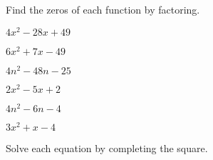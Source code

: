 \documentclass{report}
\theoremstyle{definition}
\begin{document}
 \newpage


\noindent Find the zeros of each function by factoring.\\
 
 \begin{enumerate}
\setcounter{enumi}{2}


	\begin{minipage}[t]{0.45\linewidth}
		\item  $4x^2-28x+49$ \\
		\vspace{2.5cm}
	\end{minipage}
	\hfill
	\begin{minipage}[t]{0.45\linewidth}
		\item  $6x^2+7x-49$\\
		\vspace{2.5cm}
	\end{minipage}
	\begin{minipage}[t]{0.45\linewidth}
		\item $4n^2-48n-25$\\
		\vspace{2.5cm}
	\end{minipage}
	\hfill
	\begin{minipage}[t]{0.45\linewidth}
		\item $2x^2-5x+2$\\
		\vspace{2.5cm}
	\end{minipage}
	\begin{minipage}[t]{0.45\linewidth}
		\item $4n^2-6n-4$\\
		\vspace{2.5cm}
	\end{minipage}
	\hfill
	\begin{minipage}[t]{0.45\linewidth}
		\item $3x^2+x-4$ \\
		\vspace{2.5cm}
	\end{minipage}

\end{enumerate}

\vspace{-1.5cm}

\noindent Solve each equation by completing the square.\\
\end{document}
